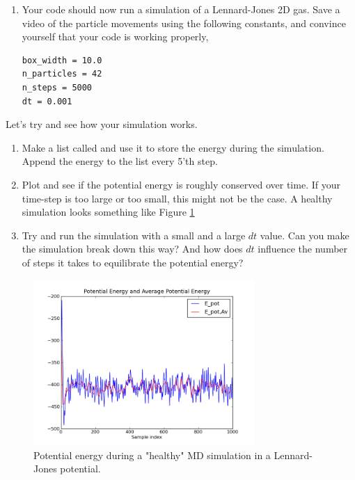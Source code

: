 \documentclass{article}
\begin{document}
\begin{enumerate}[resume]
    \item Your code should now run a simulation of a Lennard-Jones 2D gas.
        Save a video of the particle movements using the following constants, and convince yourself that your code is working properly,

\begin{lstlisting}
box_width = 10.0
n_particles = 42
n_steps = 5000
dt = 0.001
\end{lstlisting}

\end{enumerate}

Let's try and see how your simulation works.

\begin{enumerate}[resume]

    \item Make a list called  and use it to store the energy during the simulation.
        Append the energy to the list every 5'th step.

    \item Plot  and see if the potential energy is roughly conserved over time.
        If your time-step is too large or too small, this might not be the case.
        A healthy simulation looks something like Figure \ref{fig:potential_energy}

    \item Try and run the simulation with a small and a large $dt$ value. 
        Can you make the simulation break down this way?
        And how does $dt$ influence the number of steps it takes to equilibrate the potential energy?

\end{enumerate}

\begin{figure}[htb]
  \centering
  \includegraphics[width=0.75\textwidth]{potential_energy.png}
  \caption{Potential energy during a "healthy" MD simulation in a Lennard-Jones potential.}
  \label{fig:potential_energy}
\end{figure}
\end{document}
